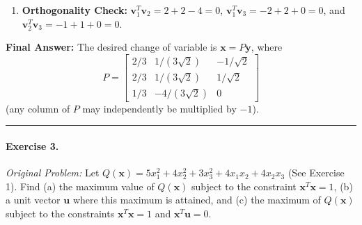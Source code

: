 \documentclass[11pt, letterpaper]{article}
\theoremstyle{definition}
\theoremstyle{remark}
\begin{document}
\begin{enumerate}[leftmargin=2em]
\[    \]
    Thus $x_1 = -x_2$ and $x_3 = 0$, with $x_2$ free. Setting $x_2 = 1$ gives $\mathbf{v}_3 = \begin{bmatrix} -1 \\ 1 \\ 0 \end{bmatrix}$, with $\|\mathbf{v}_3\| = \sqrt{(-1)^2 + 1^2 + 0^2} = \sqrt{2}$. Normalizing yields:
    \[
    \mathbf{u}_3 = \begin{bmatrix} -1/\sqrt{2} \\ 1/\sqrt{2} \\ 0 \end{bmatrix}.
    \]
    \item \textbf{Orthogonality Check:}
    $\mathbf{v}_1^T \mathbf{v}_2 = 2 + 2 - 4 = 0$, $\mathbf{v}_1^T \mathbf{v}_3 = -2 + 2 + 0 = 0$, and $\mathbf{v}_2^T \mathbf{v}_3 = -1 + 1 + 0 = 0$.
\end{enumerate}
\textbf{Final Answer:} The desired change of variable is $\mathbf{x} = P\mathbf{y}$, where
\[
P = \begin{bmatrix} 2/3 & 1/(3\sqrt{2}) & -1/\sqrt{2} \\ 2/3 & 1/(3\sqrt{2}) & 1/\sqrt{2} \\ 1/3 & -4/(3\sqrt{2}) & 0 \end{bmatrix}
\]
(any column of $P$ may independently be multiplied by $-1$).

\medskip
\hrule
\medskip

\paragraph{Exercise 3.}
\emph{Original Problem:} Let $Q(\mathbf{x}) = 5x_1^2 + 4x_2^2 + 3x_3^2 + 4x_1 x_2 + 4x_2 x_3$ (See Exercise 1). Find (a) the maximum value of $Q(\mathbf{x})$ subject to the constraint $\mathbf{x}^T \mathbf{x} = 1$, (b) a unit vector $\mathbf{u}$ where this maximum is attained, and (c) the maximum of $Q(\mathbf{x})$ subject to the constraints $\mathbf{x}^T \mathbf{x} = 1$ and $\mathbf{x}^T \mathbf{u} = 0$.
\end{document}
